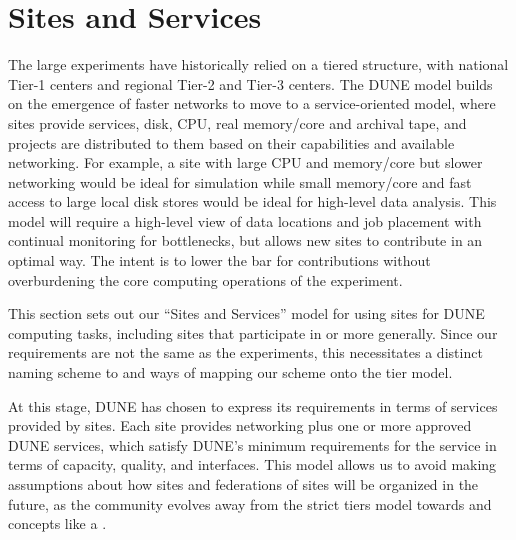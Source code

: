 \documentclass[../main-v1.tex]{subfiles}
\begin{document}
\section{Sites and Services }
\label{sec:cm:sites_and_services}  %


The large  experiments have historically relied on a tiered structure, with national Tier-1 centers %
and regional Tier-2 and Tier-3 centers.  The DUNE model builds on the emergence of faster networks to move to  a service-oriented model, where sites provide services, disk, CPU, real memory/core and archival tape, and projects are  distributed to them based on their capabilities and available networking.  For example, a site with large CPU and memory/core but slower networking would be ideal for simulation while small memory/core and fast access to large local disk stores would be ideal for high-level data analysis.  This model will require a high-level view of data locations and job placement with continual monitoring for bottlenecks, but allows new sites to contribute in an optimal way. The intent is to lower the bar for contributions without overburdening the core computing operations of the experiment.

This section sets out our ``Sites and Services'' model for using sites for DUNE computing tasks, including sites that participate in  or  more generally. Since our requirements are not the same as the  experiments, this necessitates a distinct naming scheme to  and ways of mapping our scheme onto the  tier model.

At this stage, DUNE has chosen to express its requirements in terms of services provided by sites. Each site provides networking plus one or more approved DUNE services, which satisfy DUNE's minimum requirements for the service in terms of capacity, quality, and interfaces. This model allows us to avoid making assumptions about how sites and federations of sites will be organized in the future, as the community evolves away from the strict  tiers model towards  and concepts like a .
\end{document}
